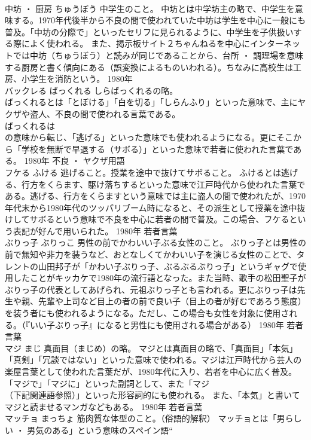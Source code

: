 \documentclass[8pt]{extreport}
\begin{document}
\begin{CJK}{UTF8}{min}
\\	中坊 ・ 厨房	ちゅうぼう	中学生のこと。	中坊とは中学坊主の略で、中学生を意味する。1970年代後半から不良の間で使われていた中坊は学生を中心に一般にも普及。「中坊の分際で」といったセリフに見られるように、中学生を子供扱いする際によく使われる。 また、掲示板サイト２ちゃんねるを中心にインターネットでは中坊（ちゅうぼう）と読みが同じであることから、台所 ・ 調理場を意味する厨房と書く傾向にある（誤変換によるものいわれる）。ちなみに高校生は工房、小学生を消防という。	1980年	
\\	バックレる	ばっくれる	しらばっくれるの略。	
\\	ばっくれるとは「とぼける」「白を切る」「しらんふり」といった意味で、主にヤクザや盗人、不良の間で使われる言葉である。 
\\	ばっくれるは
\\	の意味から転じ、「逃げる」といった意味でも使われるようになる。更にそこから「学校を無断で早退する（サボる）」といった意味で若者に使われた言葉である。	1980年	不良 ・ ヤクザ用語	
\\	フケる	ふける	逃げること。授業を途中で抜けてサボること。	ふけるとは逃げる、行方をくらます、駆け落ちするといった意味で江戸時代から使われた言葉である。逃げる、行方をくらますという意味では主に盗人の間で使われたが、1970年代末から1980年代のツッパリブーム時になると、その派生として授業を途中抜けしてサボるという意味で不良を中心に若者の間で普及。この場合、フケるという表記が好んで用いられた。	1980年	若者言葉	
\\	ぶりっ子	ぶりっこ	男性の前でかわいい子ぶる女性のこと。	ぶりっ子とは男性の前で無知や非力を装うなど、おとなしくてかわいい子を演じる女性のことで、タレントの山田邦子が「かわい子ぶりっ子、ぶるぶるぶりっ子」というギャグで使用したことがキッカケで1980年の流行語となった。また当時、歌手の松田聖子がぶりっ子の代表としてあげられ、元祖ぶりっ子とも言われる。更にぶりっ子は先生や親、先輩や上司など目上の者の前で良い子（目上の者が好むであろう態度）を装う者にも使われるようになる。ただし、この場合も女性を対象に使用される。（『いい子ぶりっ子』になると男性にも使用される場合がある）	1980年	若者言葉	
\\	マジ	まじ	真面目（まじめ）の略。	マジとは真面目の略で、「真面目」「本気」「真剣」「冗談ではない」といった意味で使われる。マジは江戸時代から芸人の楽屋言葉として使われた言葉だが、1980年代に入り、若者を中心に広く普及。「マジで」「マジに」といった副詞として、また「マジ
\\	（下記関連語参照）」といった形容詞的にも使われる。 また、「本気」と書いてマジと読ませるマンガなどもある。	1980年	若者言葉	
\\	マッチョ	まっちょ	筋肉質な体型のこと。（俗語的解釈）	マッチョとは「男らしい ・ 男気のある」という意味のスペイン語“

\end{CJK}
\end{document}
